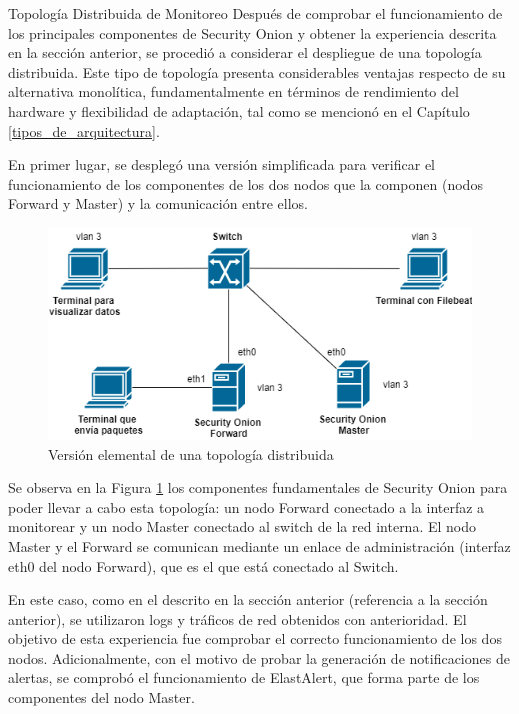     \begin{subsection}{Topología Distribuida de Monitoreo}
    \label{sec_topo_dist}
    Después de comprobar el funcionamiento de los principales componentes de Security Onion y obtener la experiencia descrita en la sección anterior, se procedió a considerar el despliegue de una topología distribuida. Este tipo de topología presenta considerables ventajas respecto de su alternativa monolítica, fundamentalmente en términos de rendimiento del hardware y flexibilidad de adaptación, tal como se mencionó en el Capítulo  \ref{tipos_de_arquitectura}.\par
    En primer lugar, se desplegó una versión simplificada para verificar el funcionamiento de los componentes de los dos nodos que la componen (nodos Forward y Master) y la comunicación entre ellos.
    \begin{figure}[H]
    \centering
    \includegraphics[width=1\textwidth]{./iteracion_1_imagenes/figura_33_b_topologia_de_prueba_2.png}
    \caption{Versión elemental de una topología distribuida}
    \label{fig:topologia_distribuida_1}
    \end{figure}
    Se observa en la Figura \ref{fig:topologia_distribuida_1} los componentes fundamentales de Security Onion para poder llevar a cabo esta topología: un nodo Forward conectado a la interfaz a monitorear y un nodo Master conectado al switch de la red interna. El nodo Master y el Forward se comunican mediante un enlace de administración (interfaz eth0 del nodo Forward), que es el que está conectado al Switch. \par
    En este caso, como en el descrito en la sección anterior (referencia a la sección anterior), se utilizaron logs y tráficos de red obtenidos con anterioridad. El objetivo de esta experiencia fue comprobar el correcto funcionamiento de los dos nodos. Adicionalmente, con el motivo de probar la generación de notificaciones de alertas, se comprobó el funcionamiento de ElastAlert, que forma parte de los componentes del nodo Master. \par

\end{subsection}
